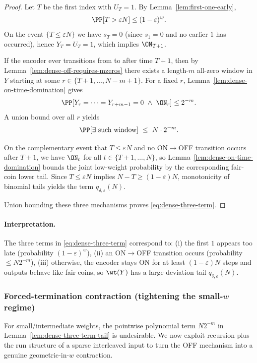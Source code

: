 \begin{proof}
Let $T$ be the first index with $U_T=1$. By Lemma~\ref{lem:first-one-early},
\[
\PP[T>\varepsilon N]\le (1-\varepsilon)^w.
\]
On the event $\{T\le \varepsilon N\}$ we have $s_T=0$ (since $s_1=0$ and no earlier $1$ has occurred),
hence $Y_T=U_T=1$, which implies $\ON_{T+1}$.

If the encoder ever transitions from \ON to \OFF after time $T+1$, then by Lemma~\ref{lem:dense-off-requires-mzeros}
there exists a length-$m$ all-zero window in $Y$ starting at some $r\in\{T+1,\dots,N-m+1\}$.
For a fixed $r$, Lemma~\ref{lem:dense-on-time-domination} gives
\[
\PP[Y_r=\cdots=Y_{r+m-1}=0 \ \wedge\ \ON_r]\le 2^{-m}.
\]
A union bound over all $r$ yields
\[
\PP[\exists\ \text{such window}] \ \le\ N\cdot 2^{-m}.
\]

On the complementary event that $T\le \varepsilon N$ and no ON$\to$OFF transition occurs after $T+1$,
we have $\ON_t$ for all $t\in\{T+1,\dots,N\}$, so Lemma~\ref{lem:dense-on-time-domination} bounds the joint
low-weight probability by the corresponding fair-coin lower tail.
Since $T\le \varepsilon N$ implies $N-T\ge (1-\varepsilon)N$, monotonicity of binomial tails yields the term
$q_{\delta,\varepsilon}(N)$.

Union bounding these three mechanisms proves \eqref{eq:dense-three-term}.
\end{proof}

\paragraph{Interpretation.}
The three terms in \eqref{eq:dense-three-term} correspond to:
(i) the first $1$ appears too late (probability $(1-\varepsilon)^w$),
(ii) an ON$\to$OFF transition occurs (probability $\le N2^{-m}$),
(iii) otherwise, the encoder stays ON for at least $(1-\varepsilon)N$ steps and outputs behave like fair coins, so
$\wt(Y)$ has a large-deviation tail $q_{\delta,\varepsilon}(N)$.

\subsubsection{Forced-termination contraction (tightening the small-$w$ regime)}
\label{subsec:inner-dense-forced-termination}

For small/intermediate weights, the pointwise polynomial term $N2^{-m}$ in Lemma~\ref{lem:dense-three-term-tail}
is undesirable. We now exploit recursion plus the run structure of a sparse interleaved input to turn the OFF mechanism
into a genuine geometric-in-$w$ contraction.

